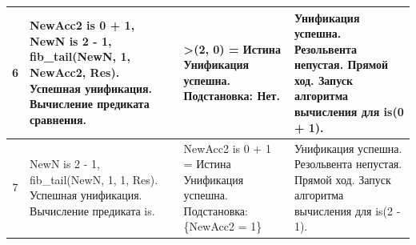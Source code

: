 \begin{tabularx}{\textwidth}{|c|>{\small}X|>{\small}X|>{\small}X|}
	6                                                                                  &
	NewAcc2 is 0 + 1, \newline
	NewN is 2 - 1, \newline
	fib\_tail(NewN, 1, NewAcc2, Res). \newline
	Успешная унификация. \newline
	Вычисление предиката сравнения.                                                    &
	>(2, 0) = \newline
	Истина \newline
	Унификация успешна. \newline
	Подстановка: \newline
	Нет.                                                                               &
	Унификация успешна. \newline
	Резольвента непустая. \newline
	Прямой ход. \newline
	Запуск алгоритма вычисления для is(0 + 1).                                           \\
	\hline

	7                                                                                  &
	NewN is 2 - 1, \newline
	fib\_tail(NewN, 1, 1, Res). \newline
	Успешная унификация. \newline
	Вычисление предиката is.                                                           &
	NewAcc2 is 0 + 1 = \newline
	Истина \newline
	Унификация успешна. \newline
	Подстановка: \newline
	\{NewAcc2 = 1\}                                                                    &
	Унификация успешна. \newline
	Резольвента непустая. \newline
	Прямой ход. \newline
	Запуск алгоритма вычисления для is(2 - 1).                                           \\
	\hline


\end{tabularx}
